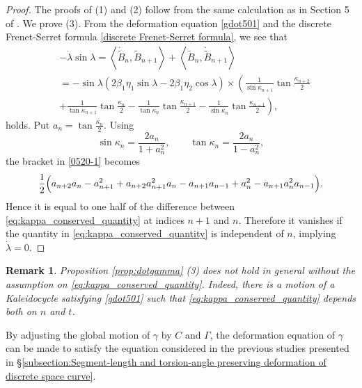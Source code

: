\documentclass[10pt,leqno]{amsart}
\newtheorem{remark}[theorem]{Remark}
\numberwithin{equation}{section}
\begin{document}
\begin{proof}
The proofs of (1) and (2) follow from the same calculation as in Section 5 of \cite{IKMO:DmKdVsG}.
We prove (3). From the deformation equation \eqref{gdot501} and the discrete Frenet-Serret formula \eqref{discrete Frenet-Serret formula}, we see that
\begin{equation}\label{0520-1}
\begin{split}
&-\dot{\lambda}\sin\lambda=\left\langle\dot{\widetilde{B}}_{n}, \widetilde{B}_{n+1}\right\rangle+\left\langle\widetilde{B}_{n}, \dot{\widetilde{B}}_{n+1}\right\rangle\\
&=-\sin\lambda \left(2\beta_{1}\eta_{1}\sin\lambda-2\beta_{1}\eta_{2}\cos\lambda\right)\times\left(\frac{1}{\sin\kappa_{n+1}}\tan\frac{\kappa_{n+2}}{2}\right.\\
&\left.+\frac{1}{\tan\kappa_{n+1}}\tan\frac{\kappa_{n}}{2}-\frac{1}{\tan\kappa_{n}}\tan\frac{\kappa_{n+1}}{2}-\frac{1}{\sin\kappa_{n}}\tan\frac{\kappa_{n-1}}{2}\right),
  \end{split}
\end{equation}
holds.
Put $a_n=\tan\frac{\kappa_n}{2}$.
Using
\[
\sin\kappa_n=\frac{2a_n}{1+a_n^2},
\qquad
\tan\kappa_n=\frac{2a_n}{1-a_n^2},
\]
the bracket in \eqref{0520-1} becomes
\[
\frac12\Bigl(
a_{n+2}a_n-a_{n+1}^2+a_{n+2}a_{n+1}^2a_n
-
a_{n+1}a_{n-1}+a_n^2-a_{n+1}a_n^2a_{n-1}
\Bigr).
\]
Hence it is equal to one half of the difference between
\eqref{eq:kappa_conserved_quantity} at indices $n+1$ and $n$.
Therefore it vanishes if the quantity in \eqref{eq:kappa_conserved_quantity} is independent of $n$, implying $\dot{\lambda}=0$.

\end{proof}
\begin{remark}
Proposition \ref{prop:dotgamma} \textnormal{(3)} does not hold in general without the assumption on \eqref{eq:kappa_conserved_quantity}.
Indeed, there is a motion of a Kaleidocycle 
satisfying \eqref{gdot501}
such that 
\eqref{eq:kappa_conserved_quantity} depends both on $n$
and $t$.
\end{remark}
By adjusting the global motion of $\gamma$ by $C$ and $\Gamma$, the deformation equation of $\gamma$ can be made to satisfy the equation considered in the previous studies presented in \S\ref{subsection:Segment-length and torsion-angle preserving deformation of discrete space curve}.
\end{document}
